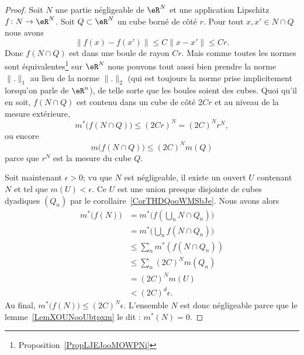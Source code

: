 \begin{proof}
    Soit \( N\) une partie négligeable de \( \eR^N\) et une application Lipschitz \( f\colon N\to \eR^N\). Soit \( Q\subset \eR^N\) un cube borné de côté \( r\). Pour tout \( x,x'\in N\cap Q\) nous avons
    \begin{equation}
        \| f(x)-f(x') \|\leq C\| x-x' \|\leq Cr.
    \end{equation}
    Donc \( f(N\cap Q)\) est dans une boule de rayon \( Cr\). Mais comme toutes les normes sont équivalentes\footnote{Proposition~\ref{PropLJEJooMOWPNi}} sur \( \eR^N\) nous pouvons tout aussi bien prendre la norme \( \| . \|_1\) au lieu de la norme \( \| . \|_2\) (qui est toujours la norme prise implicitement lorsqu'on parle de \( \eR^n\)), de telle sorte que les boules soient des cubes. Quoi qu'il en soit, \( f(N\cap Q)\) est contenu dans un cube de côté \( 2Cr\) et au niveau de la mesure extérieure,
    \begin{equation}
        m^*\big( f(N\cap Q) \big)\leq (2Cr)^N=(2C)^Nr^N,
    \end{equation}
    ou encore
    \begin{equation}
        m\big(f(N\cap Q)\big)\leq (2C)^Nm(Q)
    \end{equation}
    parce que \( r^N\) est la mesure du cube \( Q\).

    Soit maintenant \( \epsilon>0\); vu que \( N\) est négligeable, il existe un ouvert \( U\) contenant \( N\) et tel que \( m(U)<\epsilon\). Ce \( U\) est une union presque disjointe de cubes dyadiques \( (Q_n)\) par le corollaire~\ref{CorTHDQooWMSbJe}. Nous avons alors
    \begin{subequations}
        \begin{align}
            m^*\big( f(N) \big)&=m^*\big( f(\bigcup_nN\cap Q_n) \big)\\
            &=m^*\big( \bigcup_nf(N\cap Q_n) \big)\\
            &\leq \sum_nm^*(f(N\cap Q_n))\\
            &\leq \sum_n(2C)^Nm(Q_n)\\
            &=(2C)^Nm(U)\\
            &<(2C)^d\epsilon.
        \end{align}
    \end{subequations}
    Au final, \( m^*\big( f(N) \big)\leq (2C)^N\epsilon\).  L'ensemble \( N\) est donc négligeable parce que le lemme~\ref{LemXOUNooUbtpxm} le dit : \( m^*(N)=0\).
\end{proof}

